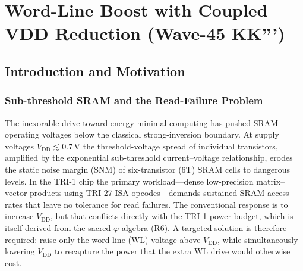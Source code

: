 
\chapter{Word-Line Boost with Coupled VDD Reduction (Wave-45 KK''')}
\label{ch:wl-boost-coupled-vdd}


\section{Introduction and Motivation}
\label{sec:wlboost-intro}

\subsection{Sub-threshold SRAM and the Read-Failure Problem}

The inexorable drive toward energy-minimal computing has pushed SRAM
operating voltages below the classical strong-inversion boundary.
At supply voltages $V_{\mathrm{DD}} \lesssim 0.7\,\text{V}$ the
threshold-voltage spread of individual transistors, amplified by the
exponential sub-threshold current–voltage relationship, erodes the
static noise margin (SNM) of six-transistor (6T) SRAM cells to
dangerous levels.  In the TRI-1 chip the primary workload—dense
low-precision matrix–vector products using TRI-27 ISA opcodes—demands
sustained SRAM access rates that leave no tolerance for read failures.
The conventional response is to increase $V_{\mathrm{DD}}$, but that
conflicts directly with the TRI-1 power budget, which is itself
derived from the sacred $\varphi$-algebra (R6).  A targeted solution
is therefore required: raise only the word-line (WL) voltage above
$V_{\mathrm{DD}}$, while simultaneously lowering $V_{\mathrm{DD}}$ to
recapture the power that the extra WL drive would otherwise cost.

